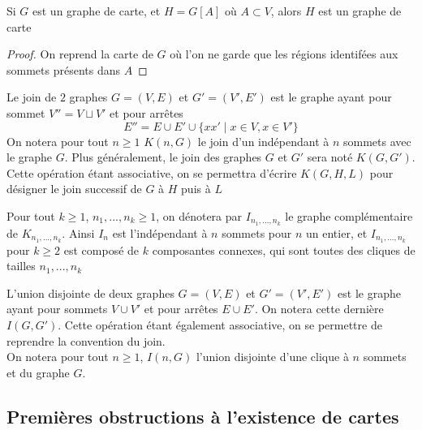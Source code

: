 \documentclass{scrartcl}
\begin{document}
\begin{flushleft}
\begin{prop}
    Si $G$ est un graphe de carte, et $H = G[A]$ où $A \subset V$, alors $H$ est un graphe de carte
\end{prop}

\begin{proof}
    On reprend la carte de $G$ où l'on ne garde que les régions identifées aux sommets présents dans $A$
\end{proof}

\begin{def*}[Join]
    Le join de $2$ graphes $G = (V, E)$ et $G' = (V', E')$ est le graphe ayant pour sommet $V'' = V \sqcup V'$ et pour arrêtes
    \[ E'' = E \cup E' \cup \{ xx' \mid x \in V, x \in V' \} \]
    On notera pour tout $n \geq 1$ $K(n, G)$ le join d'un indépendant à $n$ sommets avec le graphe $G$. Plus généralement,
    le join des graphes $G$ et $G'$ sera noté $K(G, G')$. Cette opération étant associative, on se permettra
    d'écrire $K(G, H, L)$ pour désigner le join successif de $G$ à $H$ puis à $L$
\end{def*}

\begin{def*}
    Pour tout $k \geq 1$, $n_1, ..., n_k \geq 1$, on dénotera par $I_{n_1, ..., n_k}$ le graphe complémentaire de $K_{n_1, ..., n_k}$.
    Ainsi $I_n$ est l'indépendant à $n$ sommets pour $n$ un entier, et $I_{n_1, ..., n_k}$ pour $k \geq 2$ est composé de $k$
    composantes connexes, qui sont toutes des cliques de tailles $n_1, ..., n_k$
\end{def*}

\begin{def*}
    L'union disjointe de deux graphes $G = (V, E)$ et $G' = (V', E')$ est le graphe ayant pour sommets $V \cup V'$ et pour arrêtes
    $E \cup E'$. On notera cette dernière $I(G, G')$. Cette opération étant également associative, on se permettre de reprendre la
    convention du join.\\
    On notera pour tout $n \geq 1$, $I(n, G)$ l'union disjointe d'une clique à $n$ sommets et du graphe $G$.
\end{def*}

\subsection{Premières obstructions à l'existence de cartes}


\end{flushleft}
\end{document}
